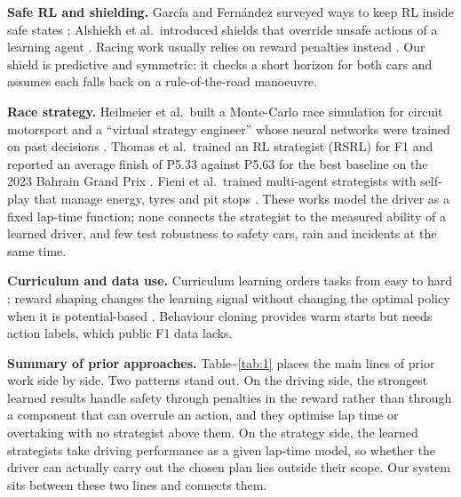 \documentclass{ieeeaccess}
\begin{document}
\textbf{Safe RL and shielding.} García and Fernández surveyed ways to keep RL inside
safe states \cite{b25}; Alshiekh et al.~introduced shields that override unsafe actions
of a learning agent \cite{b26}. Racing work usually relies on reward penalties instead
\cite{b14}. Our shield is predictive and symmetric: it checks a short horizon for both
cars and assumes each falls back on a rule-of-the-road manoeuvre.

\textbf{Race strategy.} Heilmeier et al.~built a Monte-Carlo race simulation for circuit
motorsport \cite{b8} and a ``virtual strategy engineer'' whose neural networks were trained
on past decisions \cite{b10}. Thomas et al.~trained an RL strategist (RSRL) for F1 and
reported an average finish of P5.33 against P5.63 for the best baseline on the
2023 Bahrain Grand Prix \cite{b27}. Fieni et al.~trained multi-agent strategists with
self-play that manage energy, tyres and pit stops \cite{b28}. These works model the
driver as a fixed lap-time function; none connects the strategist to the measured
ability of a learned driver, and few test robustness to safety cars, rain and
incidents at the same time.

\textbf{Curriculum and data use.} Curriculum learning orders tasks from easy to hard
\cite{b29}; reward shaping changes the learning signal without changing the optimal
policy when it is potential-based \cite{b30}. Behaviour cloning \cite{b31} provides warm starts
but needs action labels, which public F1 data lacks.

\textbf{Summary of prior approaches.} Table\textasciitilde{}\ref{tab:1} places the main lines of prior work side
by side. Two patterns stand out. On the driving side, the strongest learned results
\cite{b13,b14,b19} handle safety through penalties in the reward rather than through
a component that can overrule an action, and they optimise lap time or overtaking
with no strategist above them. On the strategy side, the learned strategists \cite{b10,b27,b28} take driving performance as a given lap-time model, so whether the
driver can actually carry out the chosen plan lies outside their scope. Our system
sits between these two lines and connects them.
\end{document}
